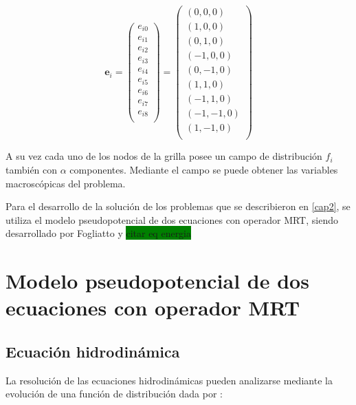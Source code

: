 \begin{equation}
    {\mathbf{e}}_{i} =  
    \left( \begin{array}{c} 
                e_{i0} \\ e_{i1}\\ e_{i2}\\ e_{i3}\\ e_{i4}\\ e_{i5}\\
                e_{i6}\\ e_{i7}\\ e_{i8}\\
            \end{array}
    \right) =
    \left( \begin{array}{c} 
        (0,0,0) \\ (1,0,0) \\ (0,1,0) \\(-1,0,0) \\ (0,-1,0) \\ (1,1,0) \\
        (-1,1,0) \\ (-1,-1,0) \\ (1,-1,0)\\ 
    \end{array}
    \right) 
    \label{eq:velgrilla}
\end{equation}

A su vez cada uno de los nodos de la grilla posee un campo de distribución $f_{i}$ también con $\alpha$ componentes. Mediante el campo se puede obtener las variables macroscópicas del problema.

Para el desarrollo de la solución de los problemas que se describieron en \ref{cap2}, se utiliza el modelo pseudopotencial de dos ecuaciones con operador MRT, siendo desarrollado por Fogliatto \cite{fogliatto2018modelado} y \colorbox{green}{citar eq energia}


\section{Modelo pseudopotencial de dos ecuaciones con operador MRT}

\subsection{Ecuación hidrodinámica}


La resolución de las ecuaciones hidrodinámicas pueden analizarse mediante la evolución de una función de distribución dada por \cite{li2013lattice}: 	

